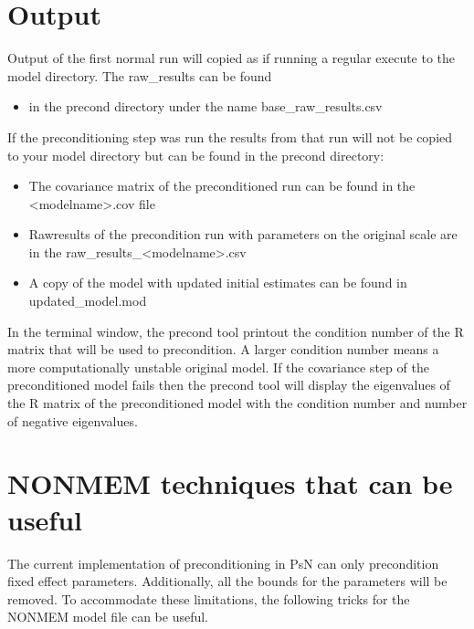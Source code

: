 \section{Output}
Output of the first normal run will copied as if running a regular execute to the model directory. The raw\_results can be found
\begin{itemize}
	\item in the precond directory under the name base\_raw\_results.csv
\end{itemize}
If the preconditioning step was run the results from that run will not be copied to your model directory but can be found
in the precond directory:
\begin{itemize}
    \item The covariance matrix of the preconditioned run can be found in the <modelname>.cov file
    \item Rawresults of the precondition run with parameters on the original scale are in the raw\_results\_<modelname>.csv
    \item A copy of the model with updated initial estimates can be found in updated\_model.mod
\end{itemize}
 

In the terminal window, the precond tool printout the condition number of the R matrix that will be used to precondition.  A larger condition number means a more computationally unstable original model. If the covariance step of the preconditioned model fails then the precond tool will display the eigenvalues of the R matrix of the preconditioned model with the condition number and number of negative eigenvalues.  

\section{NONMEM techniques that can be useful}
The current implementation of  preconditioning in PsN can only precondition fixed effect parameters. Additionally, all the bounds for the parameters will be removed. To accommodate these limitations, the following tricks for the NONMEM model file can be useful.
